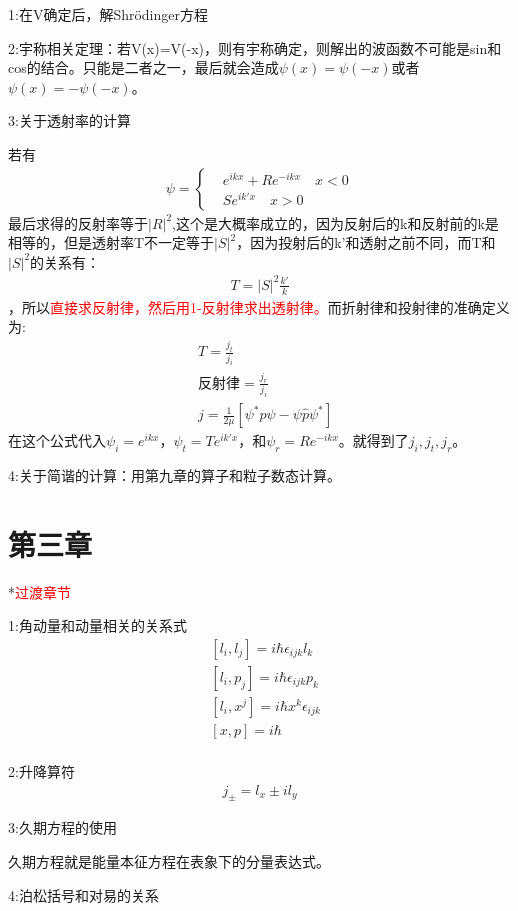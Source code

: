 \documentclass[10pt,journal,compsoc]{IEEEtran}
\begin{document}
1:在V确定后，解Shr\"odinger方程


2:宇称相关定理：若V(x)=V(-x)，则有宇称确定，则解出的波函数不可能是sin和cos的结合。只能是二者之一，最后就会造成$\psi(x)=\psi(-x)$或者$\psi(x)=-\psi(-x)$。

3:关于透射率的计算

若有\begin{align}
  \psi=\begin{cases}
& e^{ikx}+Re^{-ikx}\quad x<0\\
&Se^{ik'x}\quad x>0
\end{cases}
\end{align}
最后求得的反射率等于$|R|^2$,这个是大概率成立的，因为反射后的k和反射前的k是相等的，但是透射率T不一定等于$|S|^2$，因为投射后的k'和透射之前不同，而T和$|S|^2$的关系有：\begin{align}T=|S|^2\frac{k'}k\end{align}，所以\textcolor{red}{直接求反射律，然后用1-反射律求出透射律。}而折射律和投射律的准确定义为:
\begin{align}
  & T=\frac{j_t}{j_i}\\
  & \text{反射律}=\frac{j_r}{j_i}\\
  &j=\frac1{2\mu}[\psi^*\hat p\psi-\psi\hat p\psi^*]
\end{align}
在这个公式代入$\psi_i=e^{ikx}$，$\psi_t=Te^{ik'x}$，和$\psi_r=Re^{-ikx}$。就得到了$j_i,j_t,j_r$。

4:关于简谐的计算：用第九章的算子和粒子数态计算。

\section{第三章}
*\textcolor{red}{过渡章节}

1:角动量和动量相关的关系式
\begin{align}
  & [l_i,l_j]=i\hbar \epsilon_{ijk}l_k \\
  & [l_i,p_j]=i\hbar \epsilon_{ijk}p_k\\
  & [l_i,x^j]=i\hbar x^k\epsilon_{ijk}\\
  & [x,p]=i\hbar\\
\end{align}

2:升降算符
\begin{align}
  j_{\pm}=l_x\pm il_y
\end{align}


3:久期方程的使用

久期方程就是能量本征方程在表象下的分量表达式。

4:泊松括号和对易的关系
\end{document}
